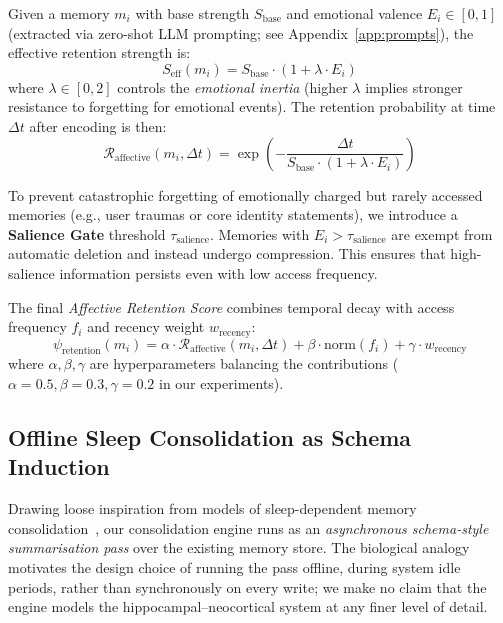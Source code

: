 Given a memory $m_i$ with base strength $S_{\text{base}}$ and emotional valence $E_i \in [0, 1]$ (extracted via zero-shot LLM prompting; see Appendix~\ref{app:prompts}), the effective retention strength is:
\begin{equation}
    S_{\text{eff}}(m_i) = S_{\text{base}} \cdot (1 + \lambda \cdot E_i)
\end{equation}
where $\lambda \in [0, 2]$ controls the \textit{emotional inertia} (higher $\lambda$ implies stronger resistance to forgetting for emotional events). The retention probability at time $\Delta t$ after encoding is then:
\begin{equation}
\label{eq:retention}
    \mathcal{R}_{\text{affective}}(m_i, \Delta t) = \exp\left(-\frac{\Delta t}{S_{\text{base}} \cdot (1 + \lambda \cdot E_i)}\right)
\end{equation}

To prevent catastrophic forgetting of emotionally charged but rarely accessed memories (e.g., user traumas or core identity statements), we introduce a \textbf{Salience Gate} threshold $\tau_{\text{salience}}$. Memories with $E_i > \tau_{\text{salience}}$ are exempt from automatic deletion and instead undergo compression. This ensures that high-salience information persists even with low access frequency.

The final \textit{Affective Retention Score} combines temporal decay with access frequency $f_i$ and recency weight $w_{\text{recency}}$:
\begin{equation}
    \psi_{\text{retention}}(m_i) = \alpha \cdot \mathcal{R}_{\text{affective}}(m_i, \Delta t) + \beta \cdot \text{norm}(f_i) + \gamma \cdot w_{\text{recency}}
\end{equation}
where $\alpha, \beta, \gamma$ are hyperparameters balancing the contributions ($\alpha=0.5, \beta=0.3, \gamma=0.2$ in our experiments).

\subsection{Offline Sleep Consolidation as Schema Induction}
\label{subsec:consolidation}

Drawing loose inspiration from models of sleep-dependent memory consolidation~\cite{mcclelland1995complementary}, our consolidation engine runs as an \emph{asynchronous schema-style summarisation pass} over the existing memory store. The biological analogy motivates the design choice of running the pass offline, during system idle periods, rather than synchronously on every write; we make no claim that the engine models the hippocampal--neocortical system at any finer level of detail.

